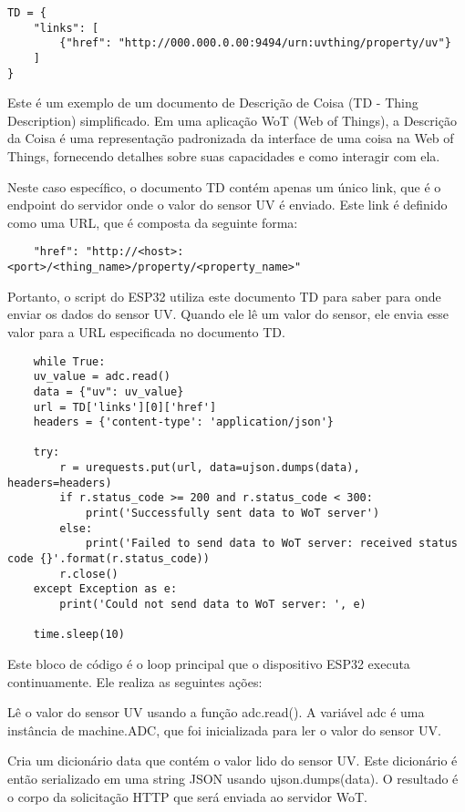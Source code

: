 \begin{verbatim}
TD = {
    "links": [
        {"href": "http://000.000.0.00:9494/urn:uvthing/property/uv"}
    ]
}
\end{verbatim}

Este é um exemplo de um documento de Descrição de Coisa (TD - Thing Description) simplificado. Em uma aplicação WoT (Web of Things), a Descrição da Coisa é uma representação padronizada da interface de uma coisa na Web of Things, fornecendo detalhes sobre suas capacidades e como interagir com ela.

Neste caso específico, o documento TD contém apenas um único link, que é o endpoint do servidor onde o valor do sensor UV é enviado. Este link é definido como uma URL, que é composta da seguinte forma:

\begin{verbatim}
    "href": "http://<host>:<port>/<thing_name>/property/<property_name>"
\end{verbatim}

Portanto, o script do ESP32 utiliza este documento TD para saber para onde enviar os dados do sensor UV. Quando ele lê um valor do sensor, ele envia esse valor para a URL especificada no documento TD.

\begin{verbatim}
    while True:
    uv_value = adc.read()
    data = {"uv": uv_value}
    url = TD['links'][0]['href']
    headers = {'content-type': 'application/json'}

    try:
        r = urequests.put(url, data=ujson.dumps(data), headers=headers)
        if r.status_code >= 200 and r.status_code < 300:
            print('Successfully sent data to WoT server')
        else:
            print('Failed to send data to WoT server: received status code {}'.format(r.status_code))
        r.close()
    except Exception as e:
        print('Could not send data to WoT server: ', e)

    time.sleep(10)
\end{verbatim}

Este bloco de código é o loop principal que o dispositivo ESP32 executa continuamente. Ele realiza as seguintes ações:

Lê o valor do sensor UV usando a função adc.read(). A variável adc é uma instância de machine.ADC, que foi inicializada para ler o valor do sensor UV.

Cria um dicionário data que contém o valor lido do sensor UV. Este dicionário é então serializado em uma string JSON usando ujson.dumps(data). O resultado é o corpo da solicitação HTTP que será enviada ao servidor WoT.

